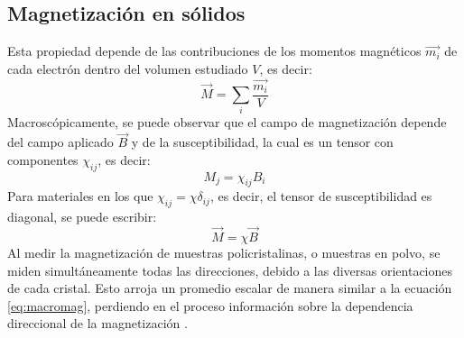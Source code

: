 \documentclass[../main.tex]{subfiles}
\begin{document}
\subsection{Magnetización en sólidos}
Esta propiedad depende de las contribuciones de los momentos magnéticos $\vec{m_i}$ de cada electrón dentro del volumen estudiado $V$, es decir:
\begin{equation}
    \vec{M}=\sum_i\dfrac{\vec{m_i}}{V}
    \label{eq:micromag}
\end{equation}
Macroscópicamente, se puede observar que el campo de magnetización depende del campo aplicado $\vec{B}$ y de la susceptibilidad, la cual es un tensor con componentes $\chi_{ij}$, es decir:
\begin{equation}
    M_j=\chi_{ij}B_i
    \label{eq:tensormag}
\end{equation}
Para materiales en los que $\chi_{ij}=\chi\delta_{ij}$, es decir, el tensor de susceptibilidad es diagonal, se puede escribir:
\begin{equation}
    \vec{M}=\chi\vec{B}
    \label{eq:macromag}
\end{equation}
Al medir la magnetización de muestras policristalinas, o muestras en polvo, se miden simultáneamente todas las direcciones, debido a las diversas orientaciones de cada cristal. Esto arroja un promedio escalar de manera similar a la ecuación \ref{eq:macromag}, perdiendo en el proceso información sobre la dependencia direccional de la magnetización \cite{Mugiraneza2022}.
\end{document}
